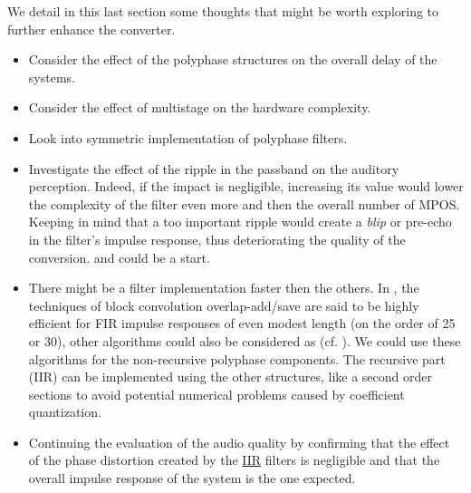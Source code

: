 We detail in this last section some thoughts that might be worth exploring to further enhance the converter.
\begin{itemize}

\item Consider the effect of the polyphase structures on the overall delay of the systems.
\item Consider the effect of multistage on the hardware complexity.
\item Look into symmetric implementation of polyphase filters. 
\item Investigate the effect of the ripple in the passband on the auditory perception. Indeed, if the impact is negligible, increasing its value would lower the complexity of the filter even more and then the overall number of MPOS. Keeping in mind that a too important ripple would create a \textit{blip} or pre-echo in the filter's impulse response, thus deteriorating the quality of the conversion. \cite{ripple1} and \cite{ripple2} could be a start. 
\item There might be a filter implementation faster then the others. In \cite{Oppenheim}, the techniques of block convolution overlap-add/save are said to be highly efficient for FIR impulse responses of even modest length (on the order of 25 or 30), other algorithms could also be considered as (cf. \cite{ffa}). We could use these algorithms for the non-recursive polyphase components. The recursive part (IIR) can be implemented using the other structures, like a second order sections to avoid potential numerical problems caused by coefficient quantization.
\item Continuing the evaluation of the audio quality by confirming that the effect of the phase distortion created by the \hyperlink{IIR}{IIR} filters is negligible and that the overall impulse response of the system is the one expected. 

\end{itemize}





